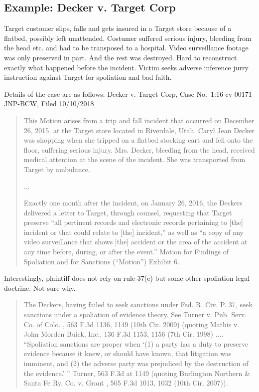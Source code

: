 \documentclass[
  10pt,
  dvipsnames,enabledeprecatedfontcommands]{scrartcl}
\begin{document}
\hypertarget{example-decker-v.-target-corp}{%
\subsection{Example: Decker v. Target
Corp}\label{example-decker-v.-target-corp}}

Target customer slips, falls and gets insured  in a
Target store because of a flatbed, possibly left unattended. Costumer
suffered serious injury, bleeding from the head etc. and had to be
transposed to a hospital. Video surveillance footage was only preserved
in part. And the rest was destroyed. Hard to reconstruct exactly what
happened before the incident. Victim seeks adverse inference jurry
instruction against Target for spoliation and bad faith.

Details of the case are as follows: Decker v. Target Corp, Case
No.~1:16-cv-00171-JNP-BCW, Filed 10/10/2018

\begin{quote}
This Motion arises from a trip and fall incident that occurred on December 26, 2015, at the Target store
located in Riverdale, Utah. Caryl Jean Decker was shopping when she tripped on a flatbed stocking cart and
fell onto the floor, suffering serious injury. Mrs. Decker, bleeding from the head, received medical attention at the scene of the incident. She was transported from Target by ambulance.

...

Exactly one month after the incident, on January 26, 2016, the Deckers delivered a letter to Target, through
counsel, requesting that Target preserve “all pertinent records and electronic records pertaining to [the]
incident or that could relate to [the] incident,” as well as “a copy of any video surveillance that shows [the] accident or the area of the accident at any time before, during, or after the event.” Motion for Findings of Spoliation and for Sanctions (“Motion”) Exhibit 6.
\end{quote}

Interestingly, plaintiff does not rely on rule 37(e) but some other
spoliation legal doctrine. Not sure why.

\begin{quote}
The Deckers, having failed to seek sanctions under Fed. R. Civ. P. 37, seek sanctions under a spoliation of
evidence theory. See Turner v. Pub. Serv. Co. of Colo. , 563 F.3d 1136, 1149 (10th Cir. 2009) (quoting Mathis v. John Morden Buick, Inc., 136 F.3d 1153, 1156 (7th Cir. 1998) .... “Spoliation
sanctions are proper when ‘(1) a party has a duty to preserve evidence because it knew, or should have
known, that litigation was imminent, and (2) the adverse party was prejudiced by the destruction of the
evidence.’ ” Turner, 563 F.3d at 1149 (quoting Burlington Northern \& Santa Fe Ry. Co. v. Grant , 505 F.3d
1013, 1032 (10th Cir. 2007)).
\end{quote}
\end{document}
